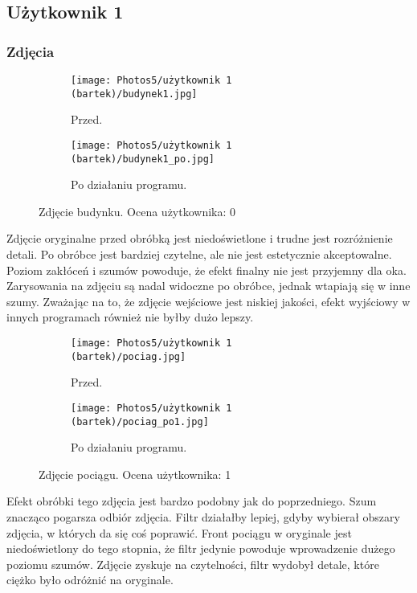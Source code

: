 \documentclass[]{mwart}
\begin{document}
\subsection{Użytkownik 1}

\subsubsection{Zdjęcia}

\begin{figure}[h!]
    \centering
    \begin{subfigure}[b]{0.49\textwidth}
        \centering
        \texttt{[image: Photos5/użytkownik 1 (bartek)/budynek1.jpg]}
        \caption{Przed.}
    \end{subfigure}
    \hfill
    \begin{subfigure}[b]{0.49\textwidth}
        \centering
        \texttt{[image: Photos5/użytkownik 1 (bartek)/budynek1\_po.jpg]}
        \caption{Po działaniu programu.}
    \end{subfigure}
    \caption{Zdjęcie budynku. Ocena użytkownika: 0}
\end{figure}
Zdjęcie oryginalne przed obróbką jest niedoświetlone i trudne jest rozróżnienie detali. Po obróbce jest bardziej czytelne, ale nie jest estetycznie akceptowalne. Poziom zakłóceń i szumów powoduje, że efekt finalny nie jest przyjemny dla oka. Zarysowania na zdjęciu są nadal widoczne po obróbce, jednak wtapiają się w inne szumy. Zważając na to, że zdjęcie wejściowe jest niskiej jakości, efekt wyjściowy w innych programach również nie byłby dużo lepszy.


\begin{figure}[h!]
    \centering
    \begin{subfigure}[b]{0.49\textwidth}
        \centering
        \texttt{[image: Photos5/użytkownik 1 (bartek)/pociag.jpg]}
        \caption{Przed.}
    \end{subfigure}
    \hfill
    \begin{subfigure}[b]{0.49\textwidth}
        \centering
        \texttt{[image: Photos5/użytkownik 1 (bartek)/pociag\_po1.jpg]}
        \caption{Po działaniu programu.}
    \end{subfigure}
    \caption{Zdjęcie pociągu. Ocena użytkownika: 1    }
\end{figure}
Efekt obróbki tego zdjęcia jest bardzo podobny jak do poprzedniego. Szum znacząco pogarsza odbiór zdjęcia. Filtr działałby lepiej, gdyby wybierał obszary zdjęcia, w których da się coś poprawić. Front pociągu w oryginale jest niedoświetlony do tego stopnia, że filtr jedynie powoduje wprowadzenie dużego poziomu szumów. Zdjęcie zyskuje na czytelności, filtr wydobył detale, które ciężko było odróżnić na oryginale.
\end{document}
